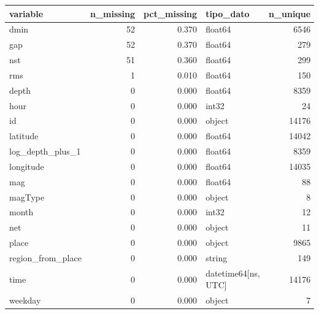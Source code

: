 \begin{tabular}{lrrlr}
\toprule
variable & n\_missing & pct\_missing & tipo\_dato & n\_unique \\
\midrule
dmin & 52 & 0.370 & float64 & 6546 \\
gap & 52 & 0.370 & float64 & 279 \\
nst & 51 & 0.360 & float64 & 299 \\
rms & 1 & 0.010 & float64 & 150 \\
depth & 0 & 0.000 & float64 & 8359 \\
hour & 0 & 0.000 & int32 & 24 \\
id & 0 & 0.000 & object & 14176 \\
latitude & 0 & 0.000 & float64 & 14042 \\
log\_depth\_plus\_1 & 0 & 0.000 & float64 & 8359 \\
longitude & 0 & 0.000 & float64 & 14035 \\
mag & 0 & 0.000 & float64 & 88 \\
magType & 0 & 0.000 & object & 8 \\
month & 0 & 0.000 & int32 & 12 \\
net & 0 & 0.000 & object & 11 \\
place & 0 & 0.000 & object & 9865 \\
region\_from\_place & 0 & 0.000 & string & 149 \\
time & 0 & 0.000 & datetime64[ns, UTC] & 14176 \\
weekday & 0 & 0.000 & object & 7 \\
\bottomrule
\end{tabular}
